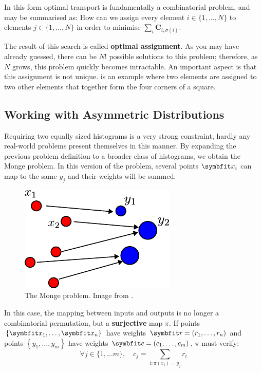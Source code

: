 In this form optimal transport is fundamentally a combinatorial problem, and may be summarised as: 
How can we assign every element $i \in \{1, \ldots, N\}$ to elements $j \in \{1, \ldots, N\}$ in order to minimise $\sum_{i} \symbf{C}_{i,\sigma(i)}$.

The result of this search is called \textbf{optimal assignment}. As you may have already guessed, there can be $N!$ possible solutions to this problem; therefore, as $N$ grows, this problem quickly becomes intractable.
An important aspect is that this assignment is not unique.  is an example where two elements are assigned to two other elements that together form the four corners of a square.

\subsection{Working with Asymmetric Distributions}\label{ssec:ot-assym}

Requiring two equally sized histograms is a very strong constraint, hardly any real-world problems present themselves in this manner. By expanding the previous problem definition to a broader class of histograms, we obtain the Monge problem. In this version of the problem, several points $\bfitx_i$ can map to the same $y_j$ and their weights will be summed.

\begin{figure}[h]
    \centering
    \includegraphics{chapters/assets/ot/monge2.pdf}
    \caption{The Monge problem. Image from \parencite{peyre2019computational}.}
    \label{fig:ot-assym}
\end{figure}

In this case, the mapping between inputs and outputs is no longer a combinatorial permutation, but a \textbf{surjective} map $\pi$. If points $\{\bfitx_1, \ldots, \bfitx_n\}$ have weights $\bfitr=\left(r_1, \ldots, r_n\right)$ and points $\left\{y_1, \ldots, y_m\right\}$ have weights $\bfitc=\left(c_1, \ldots, c_m\right)$, $\pi$ must verify:
\begin{equation}
    \forall j \in\{1, \ldots m\}, \quad c_{j}=\sum_{i: \pi\left(x_{i}\right)=y_{j}} r_{i}
    \label{eqn:ot-mass-conserv}
\end{equation}


